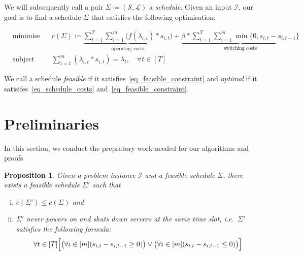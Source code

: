 \documentclass[hidelinks]{article}
\theoremstyle{plain}
\newtheorem{prop}[thm]{Proposition}
\theoremstyle{definition}
\theoremstyle{rem}
\newcommand{\inp}{\mathcal{I}}
\begin{document}
We will subsequently call a pair $\Sigma\coloneqq(\mathcal{S},\mathcal{L})$ a \textit{schedule}. Given an input $\inp$, our goal is to find a schedule $\Sigma$ that satisfies the following optimisation:

\begin{align}
	&\text{minimise}&&c(\Sigma)\coloneqq\underbrace{\sum\limits_{t=1}^{T}\sum\limits_{i=1}^{m}\bigl(f(\lambda_{i,t})*s_{i,t}\bigr)}_{\text{operating costs}}+\underbrace{\beta*\sum\limits_{t=1}^{T}\sum\limits_{i=1}^{m}\min\{0,s_{i,t}-s_{i,t-1}\}}_{\text{switching costs}}\label{eq_schedule_costs}\\ 
	&\text{subject to}&&\sum\limits_{i=1}^{m}(\lambda_{i,t}*s_{i,t})=\lambda_t,\quad \forall t\in[T]\label{eq_feasible_constraint}
\end{align}

We call a schedule \textit{feasible} if it satisfies~\eqref{eq_feasible_constraint} and \textit{optimal} if it satisifes~\eqref{eq_schedule_costs} and~\eqref{eq_feasible_constraint}.
\section{Preliminaries}
In this section, we conduct the prepratory work needed for our algorithms and proofs.

\begin{prop}\label{prop_strict_switching}
Given a problem instance $\inp$ and a feasible schedule $\Sigma$, there exists a feasible schedule $\Sigma'$ such that 
\begin{enumerate}[(i)]
		\item $c(\Sigma')\le c(\Sigma)$ and 
		\item $\Sigma'$ never powers on and shuts down servers at the same time slot, i.e.\ $\Sigma'$ satisfies the following formula:
\begin{equation}
	\forall t\in[T]\Bigl[\bigl(\forall i\in[m](s_{i,t}-s_{i,t-1}\ge0)\bigr)\lor\bigl(\forall i\in[m](s_{i,t}-s_{i,t-1}\le 0)\bigr)\Bigr]\label{eq_strict_switching}
\end{equation}
\end{enumerate}
\end{prop}
\end{document}
